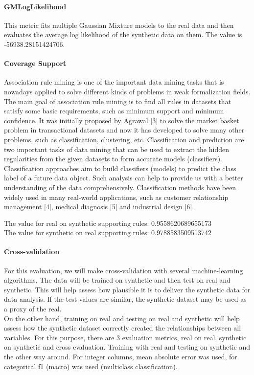 \documentclass{article}
\begin{document}
\paragraph{GMLogLikelihood}

This metric fits multiple Gaussian Mixture models to the real data and then evaluates the average log likelihood of the synthetic data on them.
The value is -56938.28151424706.\\

\paragraph{Coverage Support}
Association rule mining is one of the important data mining tasks that is nowadays applied to solve different kinds of problems in weak formalization fields. The main goal of association rule mining is to find all rules in datasets that satisfy some basic requirements, such as minimum support and minimum confidence. It was initially proposed by Agrawal [3] to solve the market basket problem in transactional datasets and now it has developed to solve many other problems, such as classification, clustering, etc. Classification and prediction are two important tasks of data mining that can be used to extract the hidden regularities from the given datasets to form accurate models (classifiers). Classification approaches aim to build classifiers (models) to predict the class label of a future data object. Such analysis can help to provide us with a better understanding of the data comprehensively. Classification methods have been widely used in many real-world applications, such as customer relationship management [4], medical diagnosis [5] and industrial design [6].

The value for real on synthetic supporting rules: 0.9558620689655173 \\

The value for synthetic on real supporting rules: 0.9788583509513742 \\


\paragraph{Cross-validation}
For this evaluation, we will make cross-validation with several machine-learning algorithms.
The data will be trained on synthetic and then test on real and synthetic. This will help assess how plausible it is to deliver the synthetic data for data analysis. If the test values are similar, the synthetic dataset may be used as a proxy of the real.\\
On the other hand, training on real and testing on real and synthetic will help assess how the synthetic dataset correctly created the relationships between all variables.
For this purpose, there are 3 evaluation metrics, real on real, synthetic on synthetic and cross evaluation. Training with real and testing on synthetic and the other way around. For integer columns, mean absolute error was used, for categorical f1 (macro) was used (multiclass classification).\\
\end{document}
